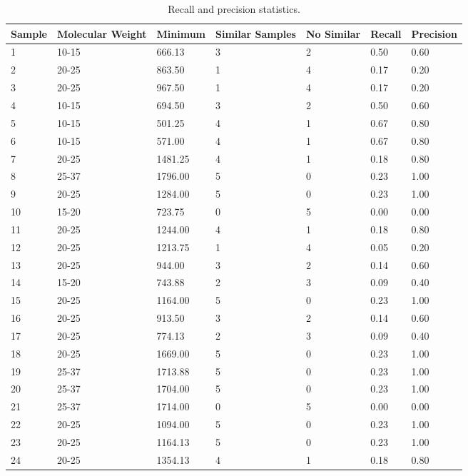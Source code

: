\documentclass[a4paper]{llncs}
\begin{document}
\begin{table}[h!]
\centering
\caption{Recall and precision statistics.}

\begin{tabular}{p{1.5cm}p{1.5cm}p{1.5cm}p{1.5cm}p{1.5cm}p{1.5cm}p{1.5cm}}
\hline

Sample  & Molecular Weight & Minimum & Similar Samples & No Similar & Recall & Precision\\
\hline
\hline
1 & 10-15 & 666.13 & 3 & 2 & 0.50 & 0.60\\
\hline
2 & 20-25 & 863.50 & 1 & 4 & 0.17 & 0.20\\
\hline
3 & 20-25 & 967.50 & 1 & 4 & 0.17 & 0.20\\
\hline
4 & 10-15 & 694.50 & 3 & 2 & 0.50 & 0.60\\
\hline
5 & 10-15 & 501.25 & 4 & 1 & 0.67 & 0.80\\
\hline
6 & 10-15 & 571.00 & 4 & 1 & 0.67 & 0.80 \\
\hline
7 & 20-25 & 1481.25 & 4 & 1 & 0.18 & 0.80\\
\hline
8 & 25-37 & 1796.00 & 5 & 0 & 0.23 & 1.00\\
\hline
9 & 20-25 & 1284.00 & 5 & 0 & 0.23 & 1.00\\
\hline
10 & 15-20 & 723.75 & 0 & 5 & 0.00 & 0.00\\
\hline
11 & 20-25 & 1244.00 & 4 & 1 & 0.18 & 0.80\\
\hline
12 & 20-25 & 1213.75 & 1 & 4 & 0.05 & 0.20\\
\hline
13 & 20-25 & 944.00 & 3 & 2 & 0.14 & 0.60\\
\hline
14 & 15-20 & 743.88 & 2 & 3 & 0.09 & 0.40\\
\hline
15 & 20-25 & 1164.00 & 5 & 0 & 0.23 & 1.00\\
\hline
16 & 20-25 & 913.50 & 3 & 2 & 0.14 & 0.60\\
\hline
17 & 20-25 & 774.13 & 2 & 3 & 0.09 & 0.40\\
\hline
18 & 20-25 & 1669.00 & 5 & 0 & 0.23 & 1.00\\
\hline
19 & 25-37 & 1713.88 & 5 & 0 & 0.23 & 1.00\\
\hline
20 & 25-37 & 1704.00 & 5 & 0 & 0.23 & 1.00\\
\hline
21 & 25-37 & 1714.00 & 0 & 5 & 0.00 & 0.00\\
\hline
22 & 20-25 & 1094.00 & 5 & 0 & 0.23 & 1.00\\
\hline
23 & 20-25 & 1164.13 & 5 & 0 & 0.23 & 1.00\\
\hline
24 & 20-25 & 1354.13 & 4 & 1 & 0.18 & 0.80\\

\end{tabular}
\end{table}
\end{document}
